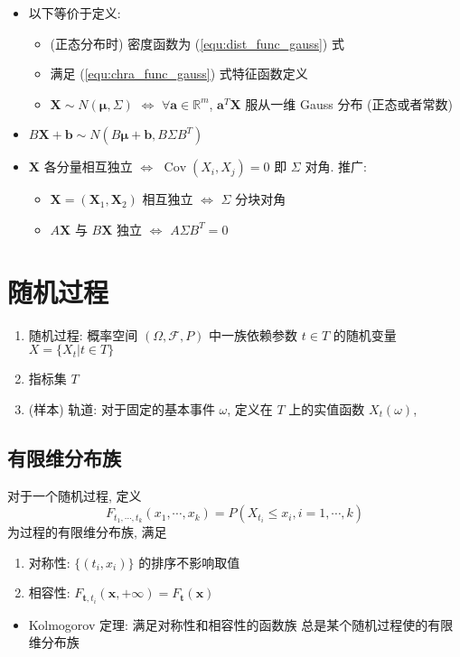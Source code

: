 \documentclass[11pt,a4paper,twocolumn]{article} %
\numberwithin{equation}{section} %
\renewcommand*{\vec}[1]{\bm{#1}} %
\DeclareMathOperator\cov{Cov}
\begin{document}
\begin{enumerate}
\begin{itemize}
		\item 以下等价于定义: 
		\begin{itemize}
			\item (正态分布时) 密度函数为 (\ref{equ:dist_func_gauss}) 式
			\item 满足 (\ref{equ:chra_func_gauss}) 式特征函数定义
			\item $\vec X\sim N(\vec \mu, \Sigma)$ $\Leftrightarrow$ 
			$\forall \vec a \in \mathbb R^m$, $\vec a^T\vec X$ 
			服从一维 Gauss 分布 (正态或者常数)
		\end{itemize}
		\item $B\vec X + \vec b \sim N(B\vec\mu + \vec b, B\Sigma B^T)$
		\item $\vec X$ 各分量相互独立 $\Leftrightarrow$ $\cov(X_i, X_j) = 0$
		即 $\Sigma$ 对角. 推广: 
		\begin{itemize}
			\item $\vec X = (\vec X_1, \vec X_2)$ 相互独立 $\Leftrightarrow$ 
			$\Sigma$ 分块对角
			\item $A\vec X$ 与 $B\vec X$ 独立 $\Leftrightarrow$ 
			$A\Sigma B^T = 0$
		\end{itemize}
	\end{itemize}
\end{enumerate}
\section{随机过程} %
\label{sec:random_process}
\begin{enumerate}
	\item 随机过程: 概率空间 $(\Omega, \mathscr F, P)$ 中一族依赖参数 $t\in T$ 
	的随机变量 $X = \{X_t|t\in T\}$ 
	\item 指标集 $T$ 
	\item (样本) 轨道: 对于固定的基本事件 $\omega$, 定义在 $T$ 上的实值函数
	$X_t(\omega)$,
\end{enumerate}
\subsection{有限维分布族} %
\label{sub:dist_in_process}
对于一个随机过程, 定义
$$
	F_{t_1,\cdots, t_k}(x_1, \cdots, x_k) = P(X_{t_i}\le x_i, i = 1, \cdots, k)
$$
为过程的有限维分布族, 满足
\begin{enumerate}
	\item 对称性: $\{(t_i, x_i)\}$ 的排序不影响取值
	\item 相容性: $F_{\vec t, t_i}(\vec x, +\infty) = F_{\vec t}(\vec x)$
\end{enumerate}
\begin{itemize}
	\item Kolmogorov 定理: 满足对称性和相容性的函数族
	总是某个随机过程使的有限维分布族
\end{itemize}
\end{document}
